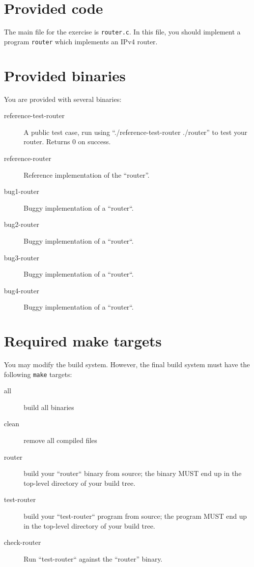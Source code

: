 \documentclass{article}
\begin{document}


\section{Provided code}



The main file for the exercise is {\tt router.c}. In this file, you
should implement a program {\tt router} which implements an IPv4 router.


\section{Provided binaries} \label{sec:binaries}

You are provided with several binaries:

\begin{description}
\item[reference-test-router] A public test case, run using ``./reference-test-router ./router''
  to test your router. Returns 0 on success.
\item[reference-router] Reference implementation of the ``router''.
\item[bug1-router] Buggy implementation of a ``router``.
\item[bug2-router] Buggy implementation of a ``router``.
\item[bug3-router] Buggy implementation of a ``router``.
\item[bug4-router] Buggy implementation of a ``router``.
\end{description}

\newpage
\section{Required make targets}

You may modify the build system. However, the final build system must
have the following {\tt make} targets:

\begin{description}
\item[all] build all binaries
\item[clean] remove all compiled files
\item[router] build your ``router`` binary from source; the binary MUST end up in the top-level directory of your build tree.
\item[test-router] build your ``test-router`` program from source; the program MUST end up in the top-level directory of your build tree.
\item[check-router] Run ``test-router`` against the ``router'' binary.
\end{description}
\end{document}
